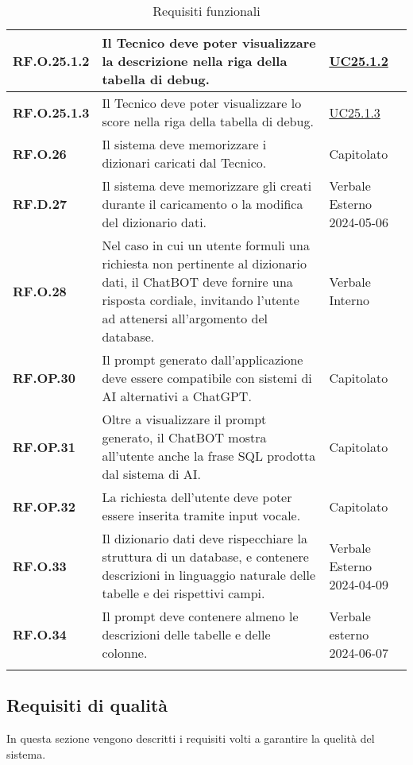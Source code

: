 \begin{longtable}{|P{3cm}|P{6,5cm}|>{\arraybackslash}P{4cm}|}
    \textbf{RF.O.25.1.2} & Il Tecnico deve poter visualizzare la descrizione nella riga della tabella di debug. &  \hyperref[UC25poin1point2]{UC25.1.2}\\
    \hline
    \textbf{RF.O.25.1.3} & Il Tecnico deve poter visualizzare lo score nella riga della tabella di debug. &  \hyperref[UC25poin1point3]{UC25.1.3}\\
    \hline
    \textbf{RF.O.26} & Il sistema deve memorizzare i dizionari caricati dal Tecnico. & Capitolato \\
    \hline
    \textbf{RF.D.27} & Il sistema deve memorizzare gli  creati durante il caricamento o la modifica del dizionario dati. & Verbale Esterno 2024-05-06 \\
    \hline
    \textbf{RF.O.28} & Nel caso in cui un utente formuli una richiesta non pertinente al dizionario dati, il ChatBOT deve fornire una risposta cordiale, invitando l'utente ad attenersi all'argomento del database. & Verbale Interno \\
    \hline
    \textbf{RF.OP.30} & Il prompt generato dall'applicazione deve essere compatibile con sistemi di AI alternativi a ChatGPT. & Capitolato \\
    \hline
    \textbf{RF.OP.31} & Oltre a visualizzare il prompt generato, il ChatBOT mostra all'utente anche la frase SQL prodotta dal sistema di AI. & Capitolato \\
    \hline
    \textbf{RF.OP.32} & La richiesta dell'utente deve poter essere inserita tramite input vocale. & Capitolato \\
    \hline
    \textbf{RF.O.33} & Il dizionario dati deve rispecchiare la struttura di un database, e contenere descrizioni in linguaggio naturale delle tabelle e dei rispettivi campi. & Verbale Esterno 2024-04-09 \\
    \hline
    \textbf{RF.O.34} & Il prompt deve contenere almeno le descrizioni delle tabelle e delle colonne. & Verbale esterno 2024-06-07 \\
    \hline
\caption{Requisiti funzionali}
\label{requisitifunzionali}
\end{longtable}

\subsection{Requisiti di qualità}
In questa sezione vengono descritti i requisiti volti a garantire la quelità del sistema.

